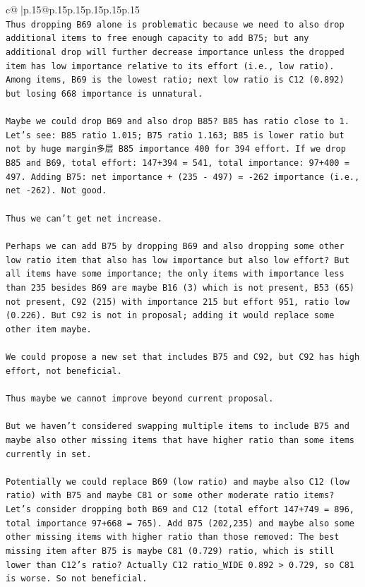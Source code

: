 \documentclass{article}
\begin{document}
{\begin{supertabular}{c@{$\;$}|p{.15\linewidth}@{}p{.15\linewidth}p{.15\linewidth}p{.15\linewidth}p{.15\linewidth}p{.15\linewidth}}
{{{\\ 
\texttt{Thus dropping B69 alone is problematic because we need to also drop additional items to free enough capacity to add B75; but any additional drop will further decrease importance unless the dropped item has low importance relative to its effort (i.e., low ratio). Among items, B69 is the lowest ratio; next low ratio is C12 (0.892) but losing 668 importance is unnatural.} \\
\\ 
\texttt{Maybe we could drop B69 and also drop B85? B85 has ratio close to 1. Let's see: B85 ratio 1.015; B75 ratio 1.163; B85 is lower ratio but not by huge margin多层 B85 importance 400 for 394 effort. If we drop B85 and B69, total effort: 147+394 = 541, total importance: 97+400 = 497. Adding B75: net importance + (235 {-} 497) = {-}262 importance (i.e., net {-}262). Not good.} \\
\\ 
\texttt{Thus we can't get net increase.} \\
\\ 
\texttt{Perhaps we can add B75 by dropping B69 and also dropping some other low ratio item that also has low importance but also low effort? But all items have some importance; the only items with importance less than 235 besides B69 are maybe B16 (3) which is not present, B53 (65) not present, C92 (215) with importance 215 but effort 951, ratio low (0.226). But C92 is not in proposal; adding it would replace some other item maybe.} \\
\\ 
\texttt{We could propose a new set that includes B75 and C92, but C92 has high effort, not beneficial.} \\
\\ 
\texttt{Thus maybe we cannot improve beyond current proposal.} \\
\\ 
\texttt{But we haven't considered swapping multiple items to include B75 and maybe also other missing items that have higher ratio than some items currently in set.} \\
\\ 
\texttt{Potentially we could replace B69 (low ratio) and maybe also C12 (low ratio) with B75 and maybe C81 or some other moderate ratio items? Let's consider dropping both B69 and C12 (total effort 147+749 = 896, total importance 97+668 = 765). Add B75 (202,235) and maybe also some other missing items with higher ratio than those removed: The best missing item after B75 is maybe C81 (0.729) ratio, which is still lower than C12's ratio? Actually C12 ratio\_WIDE 0.892 > 0.729, so C81 is worse. So not beneficial.} \\
}}}
\end{supertabular}}
\end{document}
